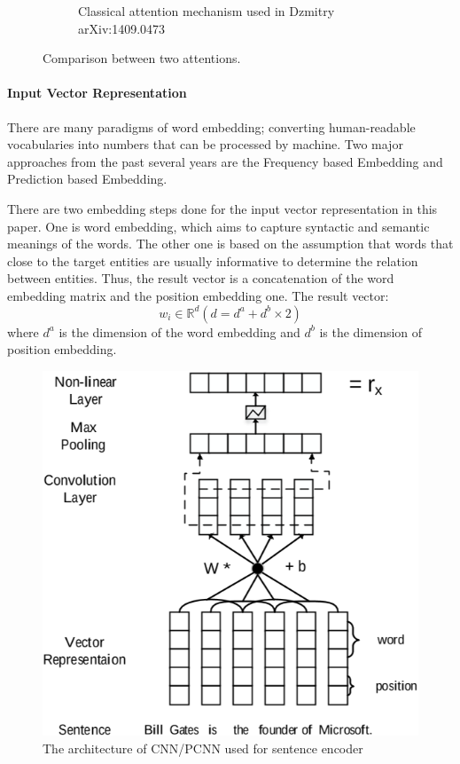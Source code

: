 \documentclass{article}
\begin{document}
\begin{figure}[h!]
\begin{subfigure}[b]{0.2\linewidth}
			\caption{Classical attention mechanism used in Dzmitry arXiv:1409.0473}
		\end{subfigure}
		\caption{Comparison between two attentions.}
		\label{fig:compare}
	\end{figure}
	
	\paragraph{Input Vector Representation}
	There are many paradigms of word embedding; converting human-readable vocabularies into numbers that can be processed by machine. Two major approaches from the past several years are the Frequency based Embedding and Prediction based Embedding. 
	
	There are two embedding steps done for the input vector representation in this paper. One is word embedding, which aims to capture syntactic and semantic meanings of the words. The other one is based on the assumption that words that close to the target entities are usually informative to determine the relation between entities. Thus, the result vector is a concatenation of the word embedding matrix and the position embedding one. The result vector:
	\[w_i \in \mathbb{R}^d(d = d^a + d^b \times 2) \]
	where \(d^a\) is the dimension of the word embedding and \(d^b\) is the dimension of position embedding.
	
	\begin{figure}[h!]
		\centering	
		\includegraphics[scale=0.2]{figure2.png}
		\caption{The architecture of CNN/PCNN used for sentence encoder}
	\end{figure}	
\end{document}
